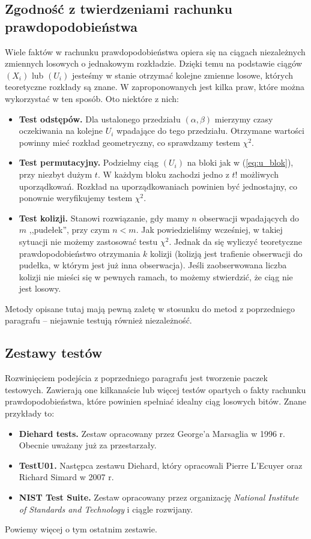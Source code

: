 \documentclass[a4paper,11pt,twoside]{book}
\theoremstyle{definition}
\begin{document}
\subsection*{Zgodność z twierdzeniami rachunku prawdopodobieństwa}
Wiele faktów w rachunku prawdopodobieństwa opiera się na ciągach niezależnych zmiennych losowych o jednakowym rozkładzie. Dzięki temu na podstawie ciągów $(X_i)$ lub $(U_i)$ jesteśmy w stanie otrzymać kolejne zmienne losowe, których teoretyczne rozkłady są znane. W \cite{knuth} zaproponowanych jest kilka praw, które można wykorzystać w ten sposób. Oto niektóre z nich:
\begin{itemize}
 \item \textbf{Test odstępów.} Dla ustalonego przedziału $(\alpha, \beta)$ mierzymy czasy oczekiwania na kolejne $U_i$ wpadające do tego przedziału. Otrzymane wartości powinny mieć rozkład geometryczny, co sprawdzamy testem $\chi^2$.
 \item \textbf{Test permutacyjny.} Podzielmy ciąg $(U_i)$ na bloki jak w (\ref{eq:u_blok}),  przy niezbyt dużym $t$. W każdym bloku zachodzi jedno z $t!$ możliwych uporządkowań. Rozkład na uporządkowaniach powinien być jednostajny, co ponownie weryfikujemy testem $\chi^2$.
 \item \textbf{Test kolizji.} Stanowi rozwiązanie, gdy mamy $n$ obserwacji wpadających do $m$ ,,pudełek'', przy czym $n < m$. Jak powiedzieliśmy wcześniej, w takiej sytuacji nie możemy zastosować testu $\chi^2$. Jednak da się wyliczyć teoretyczne prawdopodobieństwo otrzymania $k$ kolizji (kolizją jest trafienie obserwacji do pudełka, w którym jest już inna obserwacja). Jeśli zaobserwowana liczba kolizji nie mieści się w pewnych ramach, to możemy stwierdzić, że ciąg nie jest losowy.
\end{itemize}
Metody opisane tutaj mają pewną zaletę w stosunku do metod z poprzedniego paragrafu -- niejawnie testują również niezależność.

\subsection*{Zestawy testów}
Rozwinięciem podejścia z poprzedniego paragrafu jest tworzenie paczek testowych. Zawierają one kilkanaście lub więcej testów opartych o fakty rachunku prawdopodobieństwa, które powinien spełniać idealny ciąg losowych bitów. Znane przykłady to:
\begin{itemize}
 \item \textbf{Diehard tests.} Zestaw opracowany przez George'a Marsaglia w 1996 r. Obecnie uważany już za przestarzały.
 \item \textbf{TestU01.} Następca zestawu Diehard, który opracowali Pierre L’Ecuyer oraz Richard Simard w 2007 r.
 \item \textbf{NIST Test Suite.} Zestaw opracowany przez organizację \textit{National Institute of Standards and Technology} i ciągle rozwijany. 
\end{itemize}
 Powiemy więcej o tym ostatnim zestawie. 
 
\end{document}
